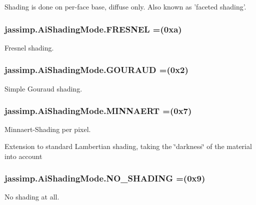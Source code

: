 Shading is done on per-\/face base, diffuse only. Also known as 'faceted shading'. \hypertarget{enumjassimp_1_1_ai_shading_mode_aa0e2790016eebbf8bb4c08fefe2360a2}{
\subsubsection[{F\+R\+E\+S\+N\+E\+L}]{\setlength{\rightskip}{0pt plus 5cm}jassimp.\+Ai\+Shading\+Mode.\+F\+R\+E\+S\+N\+E\+L =(0xa)}}\label{enumjassimp_1_1_ai_shading_mode_aa0e2790016eebbf8bb4c08fefe2360a2}
Fresnel shading. \hypertarget{enumjassimp_1_1_ai_shading_mode_a22ec257eac2b18f7fe809fb9b0fb637d}{
\subsubsection[{G\+O\+U\+R\+A\+U\+D}]{\setlength{\rightskip}{0pt plus 5cm}jassimp.\+Ai\+Shading\+Mode.\+G\+O\+U\+R\+A\+U\+D =(0x2)}}\label{enumjassimp_1_1_ai_shading_mode_a22ec257eac2b18f7fe809fb9b0fb637d}
Simple Gouraud shading. \hypertarget{enumjassimp_1_1_ai_shading_mode_a3a948ad6566455b7a1b0caf90a3c7202}{
\subsubsection[{M\+I\+N\+N\+A\+E\+R\+T}]{\setlength{\rightskip}{0pt plus 5cm}jassimp.\+Ai\+Shading\+Mode.\+M\+I\+N\+N\+A\+E\+R\+T =(0x7)}}\label{enumjassimp_1_1_ai_shading_mode_a3a948ad6566455b7a1b0caf90a3c7202}
Minnaert-\/\+Shading per pixel.

Extension to standard Lambertian shading, taking the \char`\"{}darkness\char`\"{} of the material into account \hypertarget{enumjassimp_1_1_ai_shading_mode_a06ebf687a53427ce01a1bf3953472338}{
\subsubsection[{N\+O\+\_\+\+S\+H\+A\+D\+I\+N\+G}]{\setlength{\rightskip}{0pt plus 5cm}jassimp.\+Ai\+Shading\+Mode.\+N\+O\+\_\+\+S\+H\+A\+D\+I\+N\+G =(0x9)}}\label{enumjassimp_1_1_ai_shading_mode_a06ebf687a53427ce01a1bf3953472338}
No shading at all.

